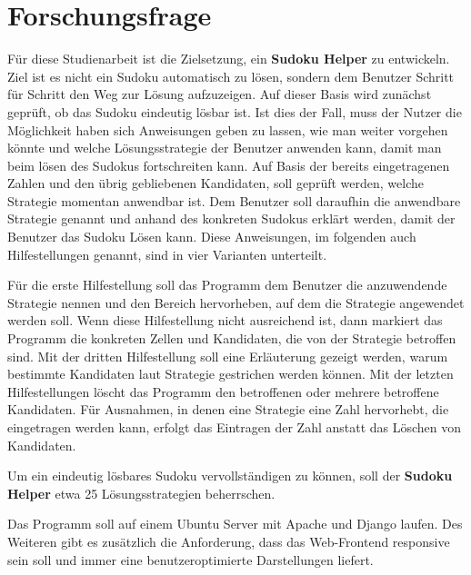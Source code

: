 \section{Forschungsfrage}
Für diese Studienarbeit ist die Zielsetzung, ein \textbf{Sudoku Helper} zu entwickeln. Ziel ist es nicht ein Sudoku automatisch zu lösen, sondern dem Benutzer Schritt für Schritt den Weg zur Lösung aufzuzeigen. Auf dieser Basis wird zunächst geprüft, ob das Sudoku eindeutig lösbar ist. Ist dies der Fall, muss der Nutzer die Möglichkeit haben sich Anweisungen geben zu lassen, wie man weiter vorgehen könnte und welche Lösungsstrategie der Benutzer anwenden kann, damit man beim lösen des Sudokus fortschreiten kann. Auf Basis der bereits eingetragenen Zahlen und den übrig gebliebenen Kandidaten, soll geprüft werden, welche Strategie momentan anwendbar ist. Dem Benutzer soll daraufhin die anwendbare Strategie genannt und anhand des konkreten Sudokus erklärt werden, damit der Benutzer das Sudoku Lösen kann. Diese Anweisungen, im folgenden auch Hilfestellungen genannt, sind in vier Varianten unterteilt.

Für die erste Hilfestellung soll das Programm dem Benutzer die anzuwendende Strategie nennen und den Bereich hervorheben, auf dem die Strategie angewendet werden soll. Wenn diese Hilfestellung nicht ausreichend ist, dann markiert das Programm die konkreten Zellen und Kandidaten, die von der Strategie betroffen sind. Mit der dritten Hilfestellung soll eine Erläuterung gezeigt werden, warum bestimmte Kandidaten laut Strategie gestrichen werden können. Mit der letzten Hilfestellungen löscht das Programm den betroffenen oder mehrere betroffene Kandidaten. Für Ausnahmen, in denen eine Strategie eine Zahl hervorhebt, die eingetragen werden kann, erfolgt das Eintragen der Zahl anstatt das Löschen von Kandidaten.

Um ein eindeutig lösbares Sudoku vervollständigen zu können, soll der \textbf{Sudoku Helper} etwa 25 Lösungsstrategien beherrschen.

Das Programm soll auf einem Ubuntu Server mit Apache und Django laufen. Des Weiteren gibt es zusätzlich die Anforderung, dass das Web-Frontend responsive sein soll und immer eine benutzeroptimierte Darstellungen liefert.